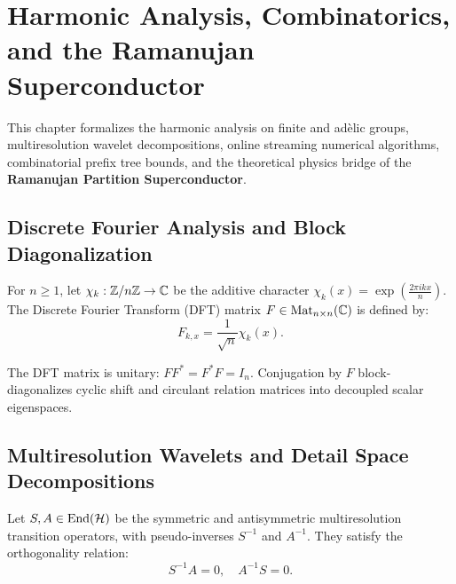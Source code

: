\chapter{Harmonic Analysis, Combinatorics, and the Ramanujan Superconductor}
\label{chap:analysis}

This chapter formalizes the harmonic analysis on finite and adèlic groups, multiresolution wavelet decompositions, online streaming numerical algorithms, combinatorial prefix tree bounds, and the theoretical physics bridge of the \textbf{Ramanujan Partition Superconductor}.

\section{Discrete Fourier Analysis and Block Diagonalization}

\begin{definition}
\label{def:dft_matrix}
\leanok
For $n \ge 1$, let $\chi_k : \mathbb{Z}/n\mathbb{Z} \to \mathbb{C}$ be the additive character $\chi_k(x) = \exp\left(\frac{2\pi i k x}{n}\right)$. The Discrete Fourier Transform (DFT) matrix $F \in \mathrm{Mat}_{n \times n}(\mathbb{C})$ is defined by:
\[
F_{k, x} = \frac{1}{\sqrt{n}} \chi_k(x).
\]
\end{definition}

\begin{theorem}
\label{thm:dft_unitary}
\leanok
The DFT matrix is unitary: $F F^* = F^* F = I_n$. Conjugation by $F$ block-diagonalizes cyclic shift and circulant relation matrices into decoupled scalar eigenspaces.
\end{theorem}

\section{Multiresolution Wavelets and Detail Space Decompositions}

\begin{definition}
\label{def:detail_space_decomposition}
\leanok
Let $S, A \in \mathrm{End}(\mathcal{H})$ be the symmetric and antisymmetric multiresolution transition operators, with pseudo-inverses $S^{-1}$ and $A^{-1}$. They satisfy the orthogonality relation:
\[
S^{-1} A = 0, \quad A^{-1} S = 0.
\]
\end{definition}

